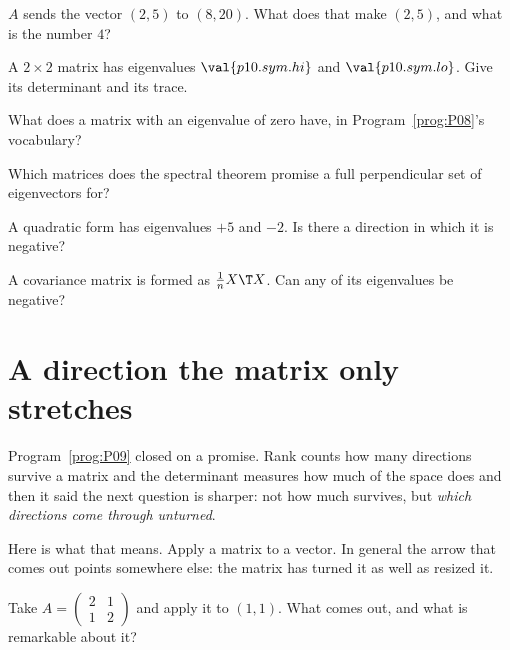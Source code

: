 \begin{quiz}
\item $A$ sends the vector $(2,5)$ to $(8,20)$. What does that make $(2,5)$,
  and what is the number $4$? 
\item A $2 \times 2$ matrix has eigenvalues $\val{p10.sym.hi}$ and
  $\val{p10.sym.lo}$. Give its determinant and its trace. 
\item What does a matrix with an eigenvalue of zero have, in
  Program~\ref{prog:P08}'s vocabulary? 
\item Which matrices does the spectral theorem promise a full perpendicular set
  of eigenvectors for? 
\item A quadratic form has eigenvalues $+5$ and $-2$. Is there a direction in
  which it is negative? 
\item A covariance matrix is formed as $\frac{1}{n}X\T X$. Can any of its
  eigenvalues be negative? 
\end{quiz}

\section{A direction the matrix only stretches}
\label{sec:P10-eigenvector}

\begin{fr}
Program~\ref{prog:P09} closed on a promise. Rank counts how many directions
survive a matrix and the determinant measures how much of the space does
\dash{} and then it said the next question is sharper: not how much survives,
but \emph{which directions come through unturned}.

Here is what that means. Apply a matrix to a vector. In general the arrow that
comes out points somewhere else: the matrix has turned it as well as resized
it.

Take $A = \begin{pmatrix} 2 & 1 \\ 1 & 2 \end{pmatrix}$ and apply it to
$(1, 1)$. What comes out, and what is remarkable about it?
\dotline
\nextframe
\end{fr}

